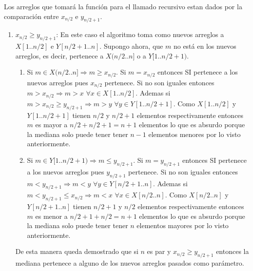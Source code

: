\documentclass[a4paper,10pt] {article}
\begin{document}
\begin{enumerate}
Los arreglos que tomar\'a la funci\'on para el llamado recursivo estan dados por la comparaci\'on entre $x_{n/2}$ e $y_{n/2+1}$.
\begin{enumerate}
\item $x_{n/2}\geq y_{n/2+1}$:
En este caso el algoritmo toma como nuevos arreglos a $X[1..n/2]$ e $Y[n/2+1..n]$. Supongo ahora, que $m$ no est\'a en los nuevos arreglos, es decir, pertenece a $X(n/2..n]$ o a $Y[1..n/2+1)$. 
\begin{enumerate}
\item
 Si $m \in X(n/2..n] \Longrightarrow m \geq x_{n/2}$. Si $m=x_{n/2}$ entonces SI pertenece a los nuevos arreglos pues $x_{n/2}$ pertenece. Si no son iguales entonces $m>x_{n/2} \Longrightarrow m>x \,\,\forall x \in X[1..n/2]$. Ademas si $m>x_{n/2}\geq y_{n/2+1} \Longrightarrow m>y \,\,\forall y \in Y[1..n/2+1]$. Como $X[1..n/2]$ y $Y[1..n/2+1]$ tienen $n/2$ y $n/2+1$ elementos respectivamente entonces $m$ es mayor a $n/2+n/2+1=n+1$ elementos lo que es absurdo porque la mediana solo puede tener tener $n-1$ elementos menores por lo visto anteriormente.
\item
  Si $m \in Y[1..n/2+1) \Longrightarrow m \leq y_{n/2+1}$. Si $m=y_{n/2+1}$ entonces SI pertenece a los nuevos arreglos pues $y_{n/2+1}$ pertenece. Si no son iguales entonces $m<y_{n/2+1} \Longrightarrow m<y \,\,\forall y \in Y[n/2+1..n]$. Ademas si $m<y_{n/2+1}\leq x_{n/2} \Longrightarrow m<x \,\,\forall x \in X[n/2..n]$. Como $X[n/2..n]$ y $Y[n/2+1..n]$ tienen $n/2+1$ y $n/2$ elementos respectivamente entonces $m$ es menor a $n/2+1+n/2=n+1$ elementos lo que es absurdo porque la mediana solo puede tener tener $n$ elementos mayores por lo visto anteriormente.
\end{enumerate}

De esta manera queda demostrado que si $n$ es par y $x_{n/2}\geq y_{n/2+1}$ entonces la mediana pertenece a alguno de los nuevos arreglos pasados como par\'ametro.



\end{enumerate}
\end{enumerate}
\end{document}
